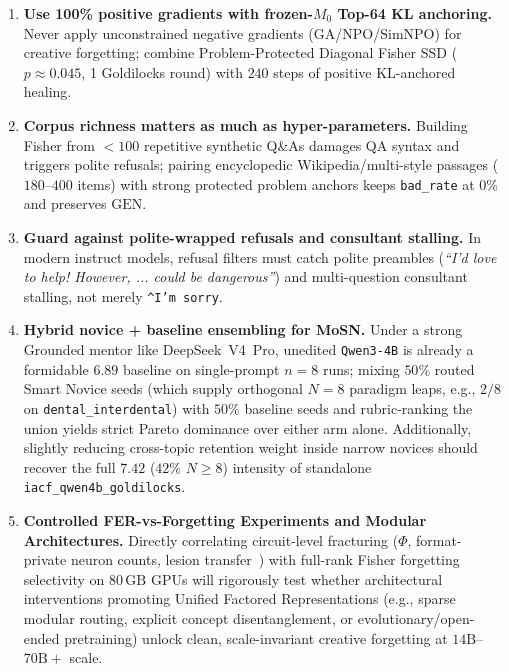 \documentclass[10.5pt,letterpaper]{article}
\begin{document}
\begin{enumerate}
  \item \textbf{Use 100\% positive gradients with frozen-$M_0$ Top-64 KL anchoring.} Never apply unconstrained negative gradients (GA/NPO/SimNPO) for creative forgetting; combine Problem-Protected Diagonal Fisher SSD ($p \approx 0.045$, 1 Goldilocks round) with $240$ steps of positive KL-anchored healing.
  \item \textbf{Corpus richness matters as much as hyper-parameters.} Building Fisher from $<100$ repetitive synthetic Q\&As damages QA syntax and triggers polite refusals; pairing encyclopedic Wikipedia/multi-style passages ($180\text{--}400$ items) with strong protected problem anchors keeps \texttt{bad\_rate} at $0\%$ and preserves $\text{GEN}$.
  \item \textbf{Guard against polite-wrapped refusals and consultant stalling.} In modern instruct models, refusal filters must catch polite preambles (\emph{``I'd love to help! However, ... could be dangerous''}) and multi-question consultant stalling, not merely \texttt{\^{}I'm sorry}.
  \item \textbf{Hybrid novice + baseline ensembling for MoSN.} Under a strong Grounded mentor like DeepSeek~V4~Pro, unedited \texttt{Qwen3-4B} is already a formidable $6.89$ baseline on single-prompt $n\!=\!8$ runs; mixing $50\%$ routed Smart Novice seeds (which supply orthogonal $N\!=\!8$ paradigm leaps, e.g., $2/8$ on \texttt{dental\_interdental}) with $50\%$ baseline seeds and rubric-ranking the union yields strict Pareto dominance over either arm alone. Additionally, slightly reducing cross-topic retention weight inside narrow novices should recover the full $7.42$ ($42\%$ $N\!\ge\!8$) intensity of standalone \texttt{iacf\_qwen4b\_goldilocks}.
  \item \textbf{Controlled FER-vs-Forgetting Experiments and Modular Architectures.} Directly correlating circuit-level fracturing ($\Phi$, format-private neuron counts, lesion transfer~\cite{kumar2025fer,lehman2026mirror}) with full-rank Fisher forgetting selectivity on $80\,\text{GB}$ GPUs will rigorously test whether architectural interventions promoting Unified Factored Representations (e.g., sparse modular routing, explicit concept disentanglement, or evolutionary/open-ended pretraining) unlock clean, scale-invariant creative forgetting at $14\text{B}$--$70\text{B}+$ scale.
\end{enumerate}



\end{document}
